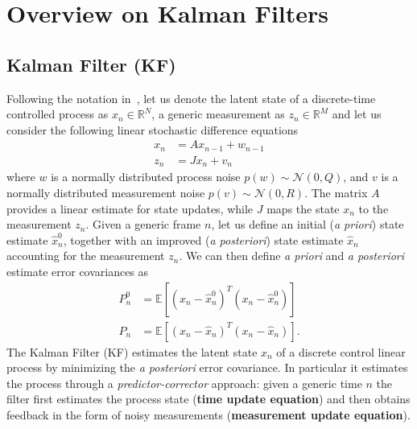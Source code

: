 \appendix

\section{Overview on Kalman Filters}

\subsection{Kalman Filter (KF)} 
\label{app:kalman}
Following the notation in~\cite{welch1995introduction}, let us denote the latent state of a discrete-time controlled process as $x_n \in \mathbb{R}^N$, a generic measurement as $z_n \in \mathbb{R}^M$ and let us consider the following linear stochastic difference equations
% 
\begin{align}
x_n &= A x_{n - 1} +  w_{n - 1} \\
z_n &= J x_n + v_n
\end{align}
% 
where $w$ is a normally distributed process noise $p(w) \sim \mathcal{N}(0, Q)$, and $v$ is a normally distributed measurement noise $p(v) \sim \mathcal{N}(0, R)$. The matrix $A$ provides a linear estimate for state updates, while $J$ maps the state $x_n$ to the measurement $z_n$.
Given a generic frame $n$, let us define an initial (\textit{a priori}) state estimate $\hat{x}_n^0$, together with an improved (\textit{a posteriori}) state estimate $\hat{x}_n$ accounting for the measurement $z_n$. 
We can then define \textit{a priori} and \textit{a posteriori} estimate error covariances as
% 
\begin{align}
	P_n^0 &= \mathbb{E}[(x_n - \hat{x}_n^0)^T(x_n - \hat{x}_n^0)]\\
	P_n   &= \mathbb{E}[(x_n - \hat{x}_n)^T(x_n - \hat{x}_n)].
\end{align}
%
The Kalman Filter (KF) estimates the latent state $x_n$ of a discrete control linear process by minimizing the \textit{a posteriori} error covariance. In particular it estimates the process through a \textit{predictor-corrector} approach: given a generic time $n$ the filter first estimates the process state (\textbf{time update equation}) and then obtains feedback in the form of noisy measurements (\textbf{measurement update equation}).
